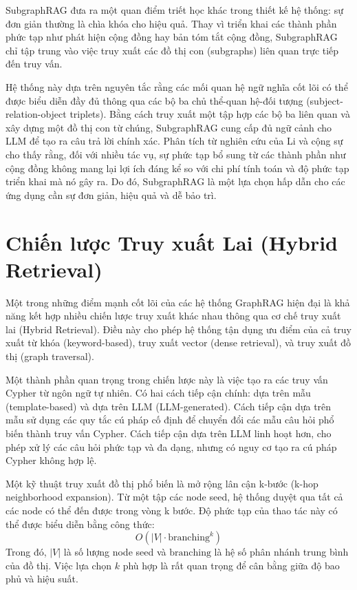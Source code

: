 SubgraphRAG \cite{subgraphrag2025} đưa ra một quan điểm triết học khác trong thiết kế hệ thống: sự đơn giản thường là chìa khóa cho hiệu quả. Thay vì triển khai các thành phần phức tạp như phát hiện cộng đồng hay bản tóm tắt cộng đồng, SubgraphRAG chỉ tập trung vào việc truy xuất các đồ thị con (subgraphs) liên quan trực tiếp đến truy vấn.

Hệ thống này dựa trên nguyên tắc rằng các mối quan hệ ngữ nghĩa cốt lõi có thể được biểu diễn đầy đủ thông qua các bộ ba chủ thể-quan hệ-đối tượng (subject-relation-object triplets). Bằng cách truy xuất một tập hợp các bộ ba liên quan và xây dựng một đồ thị con từ chúng, SubgraphRAG cung cấp đủ ngữ cảnh cho LLM để tạo ra câu trả lời chính xác. Phân tích từ nghiên cứu của Li và cộng sự cho thấy rằng, đối với nhiều tác vụ, sự phức tạp bổ sung từ các thành phần như cộng đồng không mang lại lợi ích đáng kể so với chi phí tính toán và độ phức tạp triển khai mà nó gây ra. Do đó, SubgraphRAG là một lựa chọn hấp dẫn cho các ứng dụng cần sự đơn giản, hiệu quả và dễ bảo trì.

\section{Chiến lược Truy xuất Lai (Hybrid Retrieval)}
\label{sec:hybrid_retrieval}

Một trong những điểm mạnh cốt lõi của các hệ thống GraphRAG hiện đại là khả năng kết hợp nhiều chiến lược truy xuất khác nhau thông qua cơ chế truy xuất lai (Hybrid Retrieval). Điều này cho phép hệ thống tận dụng ưu điểm của cả truy xuất từ khóa (keyword-based), truy xuất vector (dense retrieval), và truy xuất đồ thị (graph traversal).

Một thành phần quan trọng trong chiến lược này là việc tạo ra các truy vấn Cypher từ ngôn ngữ tự nhiên. Có hai cách tiếp cận chính: dựa trên mẫu (template-based) và dựa trên LLM (LLM-generated). Cách tiếp cận dựa trên mẫu sử dụng các quy tắc cú pháp cố định để chuyển đổi các mẫu câu hỏi phổ biến thành truy vấn Cypher. Cách tiếp cận dựa trên LLM linh hoạt hơn, cho phép xử lý các câu hỏi phức tạp và đa dạng, nhưng có nguy cơ tạo ra cú pháp Cypher không hợp lệ.

Một kỹ thuật truy xuất đồ thị phổ biến là mở rộng lân cận k-bước (k-hop neighborhood expansion). Từ một tập các node seed, hệ thống duyệt qua tất cả các node có thể đến được trong vòng k bước. Độ phức tạp của thao tác này có thể được biểu diễn bằng công thức:
\begin{equation}
O(|V| \cdot \text{branching}^k)
\label{eq:khop_complexity}
\end{equation}
Trong đó, $|V|$ là số lượng node seed và $\text{branching}$ là hệ số phân nhánh trung bình của đồ thị. Việc lựa chọn $k$ phù hợp là rất quan trọng để cân bằng giữa độ bao phủ và hiệu suất.

